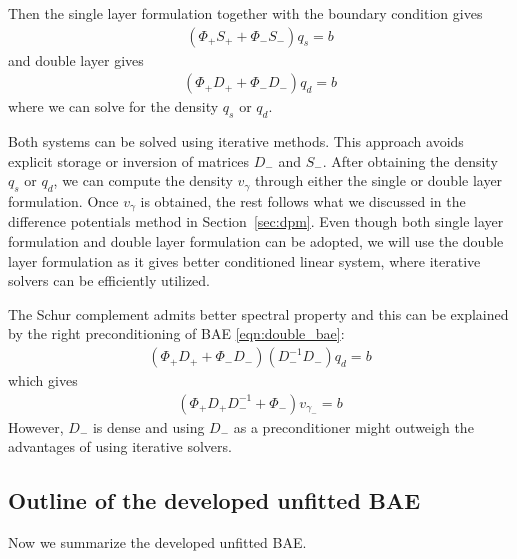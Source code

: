 Then the single layer formulation together with the boundary condition gives
\begin{align}
(\Phi_+S_++\Phi_-S_-)q_s = b
\end{align}
and double layer gives
\begin{align}\label{eqn:double_bae}
(\Phi_+D_++\Phi_-D_-)q_d = b
\end{align}
where we can solve for the density $q_s$ or $q_d$.

Both systems can be solved using iterative methods. This approach avoids explicit storage or inversion of matrices $D_-$ and $S_-$. After obtaining the density $q_s$ or $q_d$, we can compute the density $v_\gamma$ through either the single or double layer formulation. Once $v_\gamma$ is obtained, the rest follows what we discussed in the difference potentials method in Section~\ref{sec:dpm}. Even though both single layer formulation and double layer formulation can be adopted, we will use the double layer formulation as it gives better conditioned linear system, where iterative solvers can be efficiently utilized.

\begin{remark}
The Schur complement admits better spectral property and this can be explained by the right preconditioning of BAE \eqref{eqn:double_bae}:
\begin{align}
(\Phi_+D_++\Phi_-D_-)(D_-^{-1}D_-)q_d = b
\end{align}
which gives
\begin{align}
(\Phi_+D_+D_-^{-1}+\Phi_-)v_{\gamma_-} = b
\end{align}
However, $D_-$ is dense and using $D_-$ as a preconditioner might outweigh the advantages of using iterative solvers.
\end{remark}

\subsection{Outline of the developed unfitted BAE}

Now we summarize the developed unfitted BAE.

